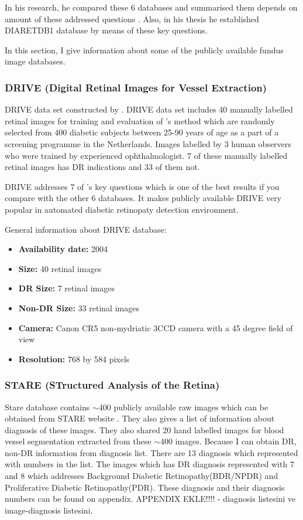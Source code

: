 In his research, he compared these 6 databases and summarised them depends on amount of these addressed questions \citep{kauppi2013constructing}. Also, in his thesis he established DIARETDB1 database by means of these key questions.

In this section, I give information about some of the publicly available fundus image databases.

\subsubsection{DRIVE (Digital Retinal Images for Vessel Extraction)}
DRIVE data set constructed by \citet{staal2004ridge}.
DRIVE data set includes 40 manually labelled retinal images for training and evaluation of \citet{staal2004ridge}'s method which are randomly selected from 400 diabetic subjects between 25-90 years of age as a part of a screening programme in the Netherlands. Images labelled by 3 human observers who were trained by experienced ophthalmologist. 7 of these manually labelled retinal images has DR indications and 33 of them not. 

DRIVE addresses 7 of \citet{kauppi2013constructing}'s key questions which is one of the best results if you compare with the other 6 databases. It makes publicly available DRIVE very popular in automated diabetic retinopaty detection environment.

General information about DRIVE database:
\begin{itemize}
    \item \textbf{Availability date: } 2004
    \item \textbf{Size: } 40 retinal images
    \item \textbf{DR Size: } 7 retinal images
    \item \textbf{Non-DR Size: } 33 retinal images
    \item \textbf{Camera: } Canon CR5 non-mydriatic 3CCD camera with a 45 degree field of view
    \item \textbf{Resolution: } 768 by 584 pixels
\end{itemize}

\subsubsection{STARE (STructured Analysis of the Retina)}
Stare database contains $\sim$400 publicly available raw images which can be obtained from STARE website \citep{STARE}. They also gives a list of information about diagnosis of these images. They also shared 20 hand labelled images for blood vessel segmentation \citep{hoover2000locating} extracted from these $\sim$400 images. Because I can obtain DR, non-DR information from diagnosis list. There are 13 diagnosis which represented with numbers in the list. The images which has DR diagnosis represented with 7 and 8 which addresses Background Diabetic Retinopathy(BDR/NPDR) and Proliferative Diabetic Retinopathy(PDR). These diagnosis and their diagnosis numbers can be found on appendix. {APPENDIX EKLE!!!!} - diagnosis listesini ve image-diagnosis listesini.

